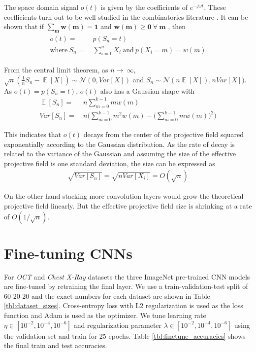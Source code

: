 The space domain signal $o(t)$ is given by the coefficients of $e^{-j\omega t}$.
These coefficients turn out to be well studied in the combinatorics literature \cite{eger2013restricted}.
It can be shown that if $\mathbf{\sum_{m}w(m) = 1}$  and $\mathbf{w(m) \geq 0 ~\forall~ m}$ , then
\begin{align}
\begin{split}
	o(t) =&~ p(S_n=t)\\ 
	\text{where}~ S_n =&~ \sum_{i=1}^{n} X_i ~\text{and}~p(X_i=m) = w(m)
\end{split}
\end{align}

From the central limit theorem, as $n \rightarrow~\infty$, $\sqrt{n}(\frac{1}{n}S_n - \mathop{\mathbb{E}}[X]) \sim \mathcal{N}(0, Var[X])$ and $S_n \sim \mathcal{N}(n\mathop{\mathbb{E}}[X]), nVar[X])$.
As $o(t) = p(S_n=t)$, $o(t)$ also has a Gaussian shape with
\begin{align}
	\mathop{\mathbb{E}}[S_n] =&~ n\sum_{m=0}^{k-1}mw(m)\\
	Var[S_n] =&~ n \Bigg(\sum_{m=0}^{k-1}m^2w(m) - \Big(\sum_{m=0}^{k-1}mw(m)\Big)^2 \Bigg)
\end{align}

This indicates that $o(t)$ decays from the center of the projective field squared exponentially according to the Gaussian distribution.
As the rate of decay is related to the variance of the Gaussian and assuming the size of the effective projective field is one standard deviation, the size can be expressed as
\begin{align}
	\sqrt{Var[S_n]} = \sqrt{nVar[X_i]} = O(\sqrt{n})
\end{align}

On the other hand stacking more convolution layers would grow the theoretical projective field linearly. But the effective projective field size is shrinking at a rate of $O(1/\sqrt{n})$.







\section{Fine-tuning CNNs}

For \textit{OCT} and \textit{Chest X-Ray} datasets the three ImageNet pre-trained CNN models are fine-tuned by retraining the final layer.
We use a train-validation-test split of 60-20-20 and the exact numbers for each dataset are shown in Table \ref{tbl:dataset_sizes}.
Cross-entropy loss with L2 regularization is used as the loss function and  Adam \cite{kingma2014adam} is used as the optimizer.
We tune learning rate $\eta \in [10^{-2}, 10^{-4}, 10^{-6}]$ and regularization parameter $\lambda \in [10^{-2}, 10^{-4}, 10^{-6}]$ using the validation set and train for 25 epochs.
Table \ref{tbl:finetune_accuracies} shows the final train and test accuracies.

